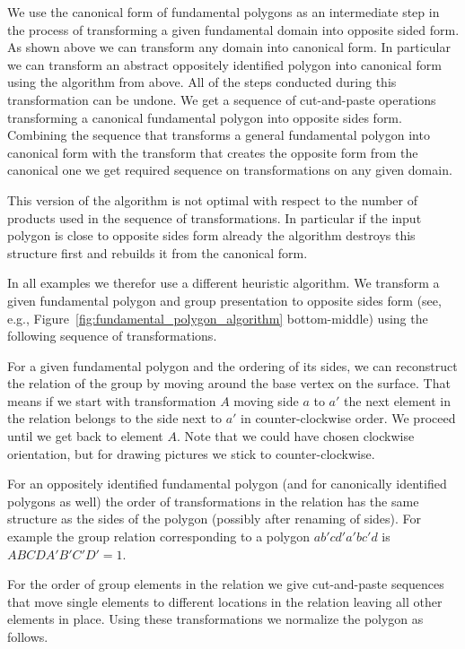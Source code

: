 \documentclass[Thesis.tex]{subfiles}
\begin{document}
  We use the canonical form of fundamental polygons as an intermediate step in the process of transforming a given fundamental domain into opposite sided form. As shown above we can transform any domain into canonical form. In particular we can transform an abstract oppositely identified polygon into canonical form using the algorithm from above. All of the steps conducted during this transformation can be undone. We get a sequence of cut-and-paste operations transforming a canonical fundamental polygon into opposite sides form. Combining the sequence that transforms a general fundamental polygon into canonical form with the transform that creates the opposite form from the canonical one we get required sequence on transformations on any given domain.

  This version of the algorithm is not optimal with respect to the number of products used in the sequence of transformations. In particular if the input polygon is close to opposite sides form already the algorithm destroys this structure first and rebuilds it from the canonical form.

  In all examples we therefor use a different heuristic algorithm. We transform a given fundamental polygon and group presentation to opposite sides form (see, e.g., Figure~\ref{fig:fundamental_polygon_algorithm} bottom-middle) using the following sequence of transformations.

  For a given fundamental polygon and the ordering of its sides, we can reconstruct the relation of the group by moving around the base vertex on the surface. That means if we start with transformation $A$ moving side $a$ to $a'$ the next element in the relation belongs to the side next to $a'$ in counter-clockwise order. We proceed until we get back to element $A$. Note that we could have chosen clockwise orientation, but for drawing pictures we stick to counter-clockwise.

  For an oppositely identified fundamental polygon (and for canonically identified polygons as well) the order of transformations in the relation has the same structure as the sides of the polygon (possibly after renaming of sides). For example the group relation corresponding to a polygon $ab'cd'a'bc'd$ is $ABCDA'B'C'D'=1$.

  For the order of group elements in the relation we give cut-and-paste sequences that move single elements to different locations in the relation leaving all other elements in place. Using these transformations we normalize the polygon as follows.
\end{document}
